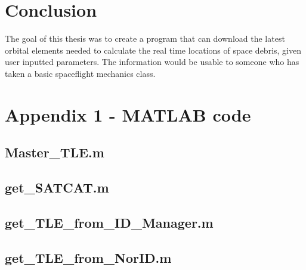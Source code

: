 \documentclass[12pt]{article}
\begin{document}
	
	\section{Conclusion}
	The goal of this thesis was to create a program that can download the latest orbital elements needed to calculate the real time locations of space debris, given user inputted parameters. The information would be usable to someone who has taken a basic spaceflight mechanics class. 
	

	
		
		

		
		\newpage
		\singlespacing
		\section*{Appendix 1 - MATLAB code}
		
		
	\subsection{Master\_TLE.m}
	
	\subsection{get\_SATCAT.m}
		
		\subsection{get\_TLE\_from\_ID\_Manager.m}
	
	
	\subsection{get\_TLE\_from\_NorID.m}
	
	
		
	
\end{document}

